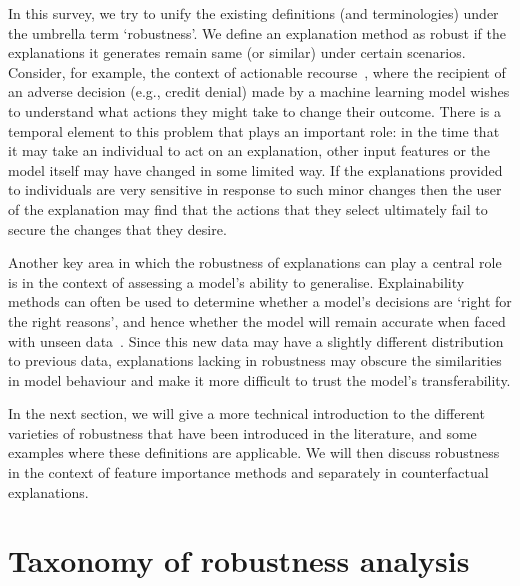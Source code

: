 \documentclass[sigconf]{acmart}
\begin{document}
In this survey, we try to unify the existing definitions (and terminologies) under the umbrella term `robustness'. We define an explanation method as robust if the explanations it generates remain same (or similar) under certain scenarios. Consider, for example, 
the context of actionable recourse~\cite{Karimi_arXiv_2020}, where the recipient of an adverse decision (e.g., credit denial) made by a machine learning model wishes to understand what actions they might take to change their outcome. There is a temporal element to this problem that plays an important role: in the time that it may take an individual to act on an explanation, other input features or the model itself may have changed in some limited way. If the explanations provided to individuals are very sensitive in response to such minor changes then the user of the explanation may find that the actions that they select ultimately fail to secure the changes that they desire.

Another key area in which the robustness of explanations can play a central role is in the context of assessing a model's ability to generalise. Explainability methods can often be used to determine whether a model's decisions are `right for the right reasons', and hence whether the model will remain accurate when faced with unseen data~\cite{Sturm_ieeetmm_2014}. Since this new data may have a slightly different distribution to previous data, explanations lacking in robustness may obscure the similarities in model behaviour and make it more difficult to trust the model's transferability.

In the next section, we will give a more technical introduction to the different varieties of robustness that have been introduced in the literature, and some examples where these definitions are applicable. We will then discuss robustness in the context of feature importance methods and separately in counterfactual explanations.

\section{Taxonomy of robustness analysis}
\label{sec:sec3}
\end{document}
